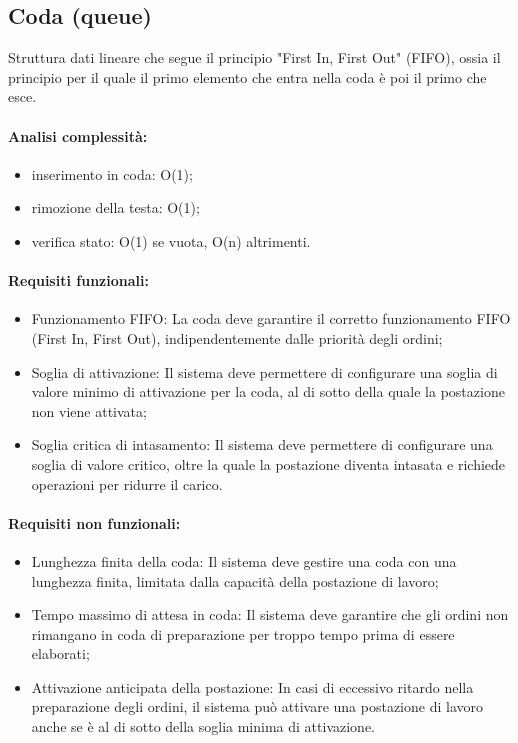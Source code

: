 \subsection{Coda (queue)}
Struttura dati lineare che segue il principio "First In, First Out" (FIFO), ossia il principio per il quale il primo elemento che entra nella coda è poi il primo che esce.
\paragraph{Analisi complessità:}
\begin{itemize}
	\item inserimento in coda: O(1);
	\item rimozione della testa: O(1);
	\item verifica stato: O(1) se vuota, O(n) altrimenti.
\end{itemize}

\paragraph{Requisiti funzionali:}
\begin{itemize}
	\item Funzionamento FIFO: La coda deve garantire il corretto funzionamento FIFO (First In, First Out), indipendentemente dalle priorità degli ordini;
	\item Soglia di attivazione: Il sistema deve permettere di configurare una soglia di valore minimo di attivazione per la coda, al di sotto della quale la postazione non viene attivata;
	\item Soglia critica di intasamento: Il sistema deve permettere di configurare una soglia di valore critico, oltre la quale la postazione diventa intasata e richiede operazioni per ridurre il carico.
\end{itemize}

\paragraph{Requisiti non funzionali:}
\begin{itemize}
	\item Lunghezza finita della coda: Il sistema deve gestire una coda con una lunghezza finita, limitata dalla capacità della postazione di lavoro;
	\item Tempo massimo di attesa in coda: Il sistema deve garantire che gli ordini non rimangano in coda di preparazione per troppo tempo prima di essere elaborati;
	\item Attivazione anticipata della postazione: In casi di eccessivo ritardo nella preparazione degli ordini, il sistema può attivare una postazione di lavoro anche se è al di sotto della soglia minima di attivazione.
\end{itemize}

\clearpage
